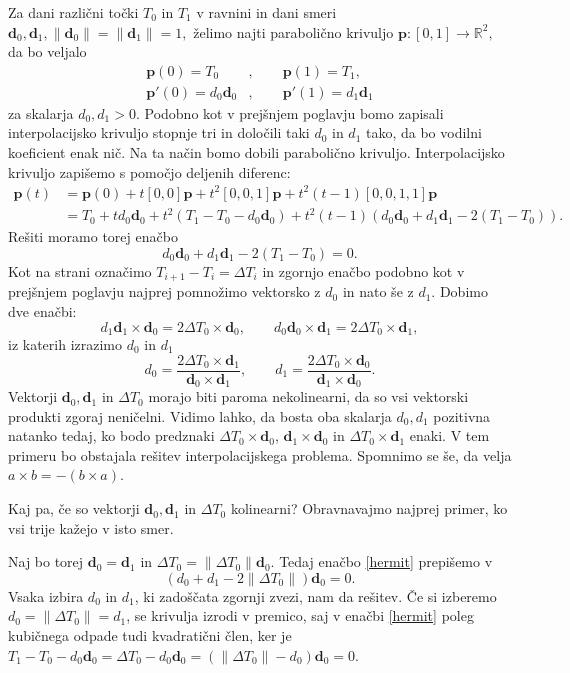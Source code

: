 \documentclass[mat1]{fmfdelo}
\newcommand{\R}{\mathbb R}
\newcommand{\de}{\Delta}
\newcommand{\dd}{\textbf{d}}
\newcommand{\pp}{\textbf{p}}
\begin{document}
Za dani različni točki $T_0$ in $T_1$ v ravnini in dani smeri $\dd_0, \dd_1, \lVert \dd_0 \rVert = \lVert \dd_1 \rVert = 1,$ želimo najti parabolično krivuljo $\pp : [ 0, 1 ] \rightarrow \R^2,$ da bo veljalo
\begin{align*}
\pp(0) = T_0&, \qquad \pp(1) = T_1, \\
\pp'(0) = d_0 \dd_0&, \qquad \pp'(1) = d_1 \dd_1 
\end{align*}
%
za skalarja $d_0, d_1 > 0$.
%
Podobno kot v prejšnjem poglavju bomo zapisali interpolacijsko krivuljo stopnje tri in določili taki $d_0$ in $d_1$ tako, da bo vodilni koeficient enak nič. Na ta način bomo dobili parabolično krivuljo. Interpolacijsko krivuljo zapišemo s pomočjo deljenih diferenc:
%
\begin{align}
\pp(t) &= \pp(0) + t [0,0]\pp + t^2[0,0,1]\pp + t^2(t - 1)[0,0,1,1]\pp  \nonumber \\
	&= T_0 + t d_0 \dd_0 + t^2(T_1 - T_0 - d_0 \dd_0) + t^2(t - 1)(d_0 \dd_0 + d_1 \dd_1 - 2(T_1 - T_0)) \label{ppher}
.\end{align}
%
Rešiti moramo torej enačbo
%
\begin{equation}\label{hermit}
d_0 \dd_0 + d_1 \dd_1 - 2(T_1 - T_0) = 0
.\end{equation}
%
Kot na strani \pageref{delta} označimo $T_{i+1} - T_i = \de T_i$ in zgornjo enačbo podobno kot v prejšnjem poglavju najprej pomnožimo vektorsko z $d_0$ in nato še z $d_1$. Dobimo dve enačbi:
%
\begin{equation*}
d_1 \dd_1 \times \dd_0 = 2 \de T_0 \times \dd_0, \qquad d_0 \dd_0 \times \dd_1 = 2 \de T_0 \times \dd_1,
\end{equation*}
%
iz katerih izrazimo $d_0$ in $d_1$
%
\begin{equation*}
d_0 = \frac{ 2 \de T_0 \times \dd_1}{\dd_0 \times \dd_1}, \qquad d_1 = \frac{2 \de T_0 \times \dd_0}{\dd_1 \times \dd_0}.
\end{equation*}
%
Vektorji $\dd_0, \dd_1$ in $\de T_0$ morajo biti paroma nekolinearni, da so vsi vektorski produkti zgoraj neničelni. Vidimo lahko, da bosta oba skalarja $d_0, d_1$ pozitivna natanko tedaj, ko bodo predznaki $\de T_0 \times \dd_0$, $\dd_1 \times \dd_0$ in $\de T_0 \times \dd_1$ enaki. V tem primeru bo obstajala rešitev interpolacijskega problema. Spomnimo se še, da velja $a \times b = - (b \times a)$. 

Kaj pa, če so vektorji $\dd_0, \dd_1$ in $\de T_0$ kolinearni? Obravnavajmo najprej primer, ko vsi trije kažejo v isto smer.

Naj bo torej $\dd_0 = \dd_1$ in $\de T_0 = \lVert \de T_0 \rVert \dd_0.$ Tedaj enačbo \eqref{hermit} prepišemo v
%
\begin{equation*}
(d_0 + d_1 - 2 \lVert \de T_0 \rVert) \dd_0 = 0.
\end{equation*}
%
Vsaka izbira $d_0$ in $d_1$, ki zadoščata zgornji zvezi, nam da rešitev. Če si izberemo $d_0 =  \lVert \de T_0 \rVert = d_1$, se krivulja izrodi v premico, saj v enačbi \eqref{hermit} poleg kubičnega odpade tudi kvadratični člen, ker je $T_1 - T_0 - d_0 \dd_0 = \de T_0 - d_0 \dd_0 = ( \lVert \de T_0 \rVert - d_0) \dd_0 = 0$.
\end{document}
